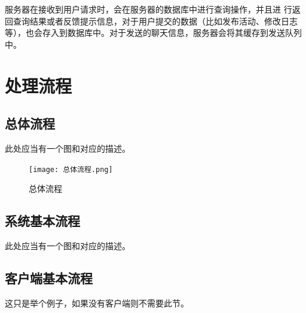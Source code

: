 服务器在接收到用户请求时，会在服务器的数据库中进行查询操作，并且进
行返回查询结果或者反馈提示信息，对于用户提交的数据（比如发布活动、修改日志等），也会存入到数据库中。对于发送的聊天信息，服务器会将其缓存到发送队列中。

\section{处理流程}
    \subsection{总体流程}
        此处应当有一个图和对应的描述。
        \begin{figure}[ht]
            \centering
            \texttt{[image: 总体流程.png]}\label{tab:classification}
            \caption{总体流程}\label{fig:noted-figure}
        \end{figure}
    \subsection{系统基本流程}
        此处应当有一个图和对应的描述。
    \subsection{客户端基本流程}
        这只是举个例子，如果没有客户端则不需要此节。
